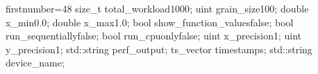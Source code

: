 \begin{cppcode*}{firstnumber=48}
    size_t total_workload{1000};
    uint grain_size{100};
    double x_min{0.0};
    double x_max{1.0};
    bool show_function_values{false};
    bool run_sequentially{false};
    bool run_cpuonly{false};
    uint x_precision{1};
    uint y_precision{1};
    std::string perf_output;
    ts_vector timestamps;
    std::string device_name;
\end{cppcode*}
